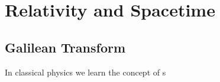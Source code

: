 \documentclass{article}
\begin{document}

\section{Relativity and Spacetime}
\subsection{Galilean Transform}
In classical physics we learn the concept of s
\end{document}
